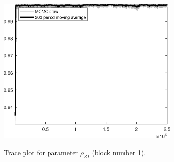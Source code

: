 \begin{figure}[H]
\centering
  \includegraphics[width=0.8\textwidth]{BRS_growth_ext_fd_v1/graphs/TracePlot_rho_ZI_blck_1}\\
    \caption{Trace plot for parameter ${\rho_{ZI}}$ (block number 1).}
\end{figure}
